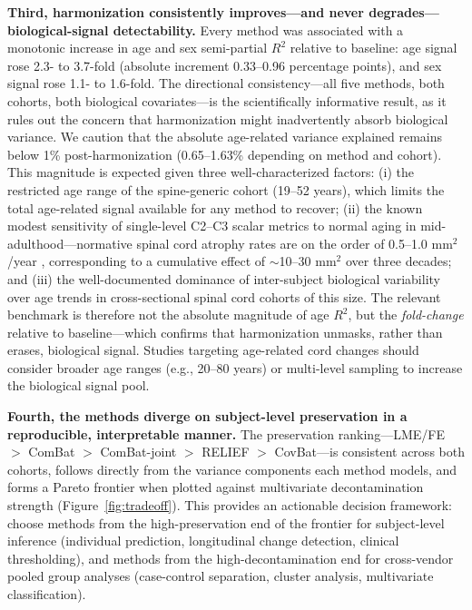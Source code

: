 \documentclass[12pt,a4paper]{article}
\begin{document}
\textbf{Third, harmonization consistently improves---and never degrades---biological-signal detectability.} Every method was associated with a monotonic increase in age and sex semi-partial $R^2$ relative to baseline: age signal rose 2.3- to 3.7-fold (absolute increment 0.33--0.96 percentage points), and sex signal rose 1.1- to 1.6-fold. The directional consistency---all five methods, both cohorts, both biological covariates---is the scientifically informative result, as it rules out the concern that harmonization might inadvertently absorb biological variance. We caution that the absolute age-related variance explained remains below 1\% post-harmonization (0.65--1.63\% depending on method and cohort). This magnitude is expected given three well-characterized factors: (i) the restricted age range of the spine-generic cohort (19--52 years), which limits the total age-related signal available for any method to recover; (ii) the known modest sensitivity of single-level C2--C3 scalar metrics to normal aging in mid-adulthood---normative spinal cord atrophy rates are on the order of 0.5--1.0 mm$^2$/year \cite{prados2017spinal}, corresponding to a cumulative effect of $\sim$10--30 mm$^2$ over three decades; and (iii) the well-documented dominance of inter-subject biological variability over age trends in cross-sectional spinal cord cohorts of this size. The relevant benchmark is therefore not the absolute magnitude of age $R^2$, but the \emph{fold-change} relative to baseline---which confirms that harmonization unmasks, rather than erases, biological signal. Studies targeting age-related cord changes should consider broader age ranges (e.g., 20--80 years) or multi-level sampling to increase the biological signal pool.

\textbf{Fourth, the methods diverge on subject-level preservation in a reproducible, interpretable manner.} The preservation ranking---LME/FE $>$ ComBat $>$ ComBat-joint $>$ RELIEF $>$ CovBat---is consistent across both cohorts, follows directly from the variance components each method models, and forms a Pareto frontier when plotted against multivariate decontamination strength (Figure~\ref{fig:tradeoff}). This provides an actionable decision framework: choose methods from the high-preservation end of the frontier for subject-level inference (individual prediction, longitudinal change detection, clinical thresholding), and methods from the high-decontamination end for cross-vendor pooled group analyses (case-control separation, cluster analysis, multivariate classification).
\end{document}
